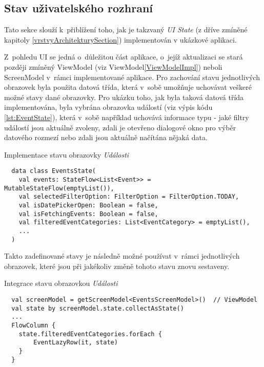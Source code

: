 
\subsection{Stav uživatelského rozhraní} \label{stateHandlingImpl}
Tato sekce slouží k~přiblížení toho, jak je takzvaný \textit{UI State} (z dříve zmíněné kapitoly \ref{vrstvyArchitekturySection}) 
implementován v ukázkové aplikaci.

Z~pohledu UI se jedná o~důležitou část aplikace, o~jejíž aktualizaci se stará později zmíněný ViewModel (viz ViewModel\ref{ViewModelImpl}) neboli ScreenModel v~rámci
implementované aplikace. 
Pro zachování stavu jednotlivých obrazovek byla použita datová třída, která v~sobě umožňuje uchovávat veškeré možné stavy dané obrazovky.
Pro ukázku toho, jak byla taková datová třída implementována, byla vybrána obrazovka událostí (viz výpis kódu \ref{lst:EventState}), která v~sobě 
například uchovává informace typu - jaké filtry událostí jsou aktuálně zvoleny, zdali je otevřeno dialogové okno pro výběr datového rozmezí 
nebo zdali jsou aktuálně načítána nějaká data.
\begin{listing}[H]
\caption{Implementace stavu obrazovky \textit{Události}}\label{lst:EventState}
\begin{verbatim}
  data class EventsState(
    val events: StateFlow<List<Event>> = MutableStateFlow(emptyList()),
    val selectedFilterOption: FilterOption = FilterOption.TODAY,
    val isDatePickerOpen: Boolean = false,
    val isFetchingEvents: Boolean = false,
    val filteredEventCategories: List<EventCategory> = emptyList(),
    ...
  )
\end{verbatim}
\end{listing}

Takto zadefinované stavy je následně možné používat v~rámci jednotlivých obrazovek, které jsou při jakékoliv změně tohoto stavu znovu sestaveny.


\begin{listing}[H]
\caption{Integrace stavu obrazovkou \textit{Události}}\label{lst:StateImpl}
\begin{verbatim}
  val screenModel = getScreenModel<EventsScreenModel>()  // ViewModel
  val state by screenModel.state.collectAsState()
  ...
  FlowColumn {
    state.filteredEventCategories.forEach {
        EventLazyRow(it, state)
    }
  }
\end{verbatim}
\end{listing}

